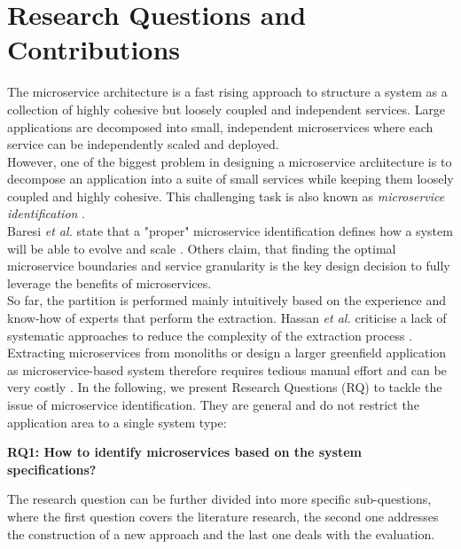 \section{Research Questions and Contributions}
\label{sec:Introduction:ResearchQuestions}
The microservice architecture is a fast rising approach to structure a system as a collection of highly cohesive but loosely coupled and independent services. Large applications are decomposed into small, independent microservices where each service can be independently scaled and deployed. 
\\
However, one of the biggest problem in designing a microservice architecture is to decompose an application into a suite of small services while keeping them loosely coupled and highly cohesive. This challenging task is also known as \textit{microservice identification} \cite{ObjectAwareAmiri}. \\
Baresi \textit{et al.} state that a "proper" microservice identification defines how a system will be able to evolve and scale \cite{interfaceAnalysisBaresi}. Others claim, that finding the optimal microservice boundaries \cite{ClassificationOfRefactoring} and service granularity  \cite{ArchitecturalMetaModelling} is the key design decision to fully leverage the benefits of microservices. 
\\
So far, the partition is performed mainly intuitively based on the experience and know-how of experts that perform the extraction. Hassan \textit{et al.} criticise a lack of systematic approaches to reduce the complexity of the extraction process \cite{ArchitecturalMetaModelling}. Extracting microservices from monoliths or design a larger greenfield application as microservice-based system therefore requires tedious manual effort and can be very costly \cite{FunctionalDecompositionHeinrich} \cite{ExtractionMazlami}. In the following, we present Research Questions (RQ) to tackle the issue of microservice identification. They are general and do not restrict the application area to a single system type:


\vspace{1cm}
\par
\begingroup
\leftskip=1cm
\rightskip=1cm

\noindent
\textbf{RQ1: How to identify microservices based on the system specifications?}

\vspace{0.5cm}
\noindent
The research question can be further divided into more specific sub-questions, where the first question covers the literature research, the second one addresses the construction of a new approach and the last one deals with the evaluation.

